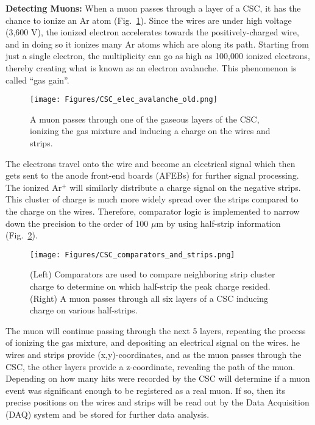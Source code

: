 {\bf Detecting Muons:}
When a muon passes through a layer of a CSC, it has the chance to ionize an Ar atom (Fig.~\ref{fig:e_avalanche}).
Since the wires are under high voltage (3,600 V), the ionized electron accelerates towards the positively-charged wire, and in doing so it ionizes many Ar atoms which are along its path. 
Starting from just a single electron, the multiplicity can go as high as 100,000 ionized electrons, thereby creating what is known as an electron avalanche. 
This phenomenon is called ``gas gain''.
\begin{figure}[pbth]
\centering
\texttt{[image: Figures/CSC\_elec\_avalanche\_old.png]}
    \caption{
    A muon passes through one of the gaseous layers of the CSC, ionizing the gas mixture and inducing a charge on the wires and strips. 
    }
    \label{fig:e_avalanche}
\end{figure}
The electrons travel onto the wire and become an electrical signal which then gets sent to the anode front-end boards (AFEBs) for further signal processing.
The ionized Ar$^+$ will similarly distribute a charge signal on the negative strips. 
This cluster of charge is much more widely spread over the strips compared to the charge on the wires.
Therefore, comparator logic is implemented to narrow down the precision to the order of 100 $\mu$m by using half-strip information (Fig.~\ref{fig:comparators}).
\begin{figure}[pbth]
\centering
\texttt{[image: Figures/CSC\_comparators\_and\_strips.png]}
    \caption{
    (Left) Comparators are used to compare neighboring strip cluster charge to determine on which half-strip the peak charge resided.
    (Right) A muon passes through all six layers of a CSC inducing charge on various half-strips.
    }
    \label{fig:comparators}
\end{figure}

The muon will continue passing through the next 5 layers, repeating the process of ionizing the gas mixture, and depositing an electrical signal on the wires. 
he wires and strips provide (x,y)-coordinates, and as the muon passes through the CSC, the other layers provide a z-coordinate, revealing the path of the muon.
Depending on how many hits were recorded by the CSC will determine if a muon event was significant enough to be registered as a real muon. 
If so, then its precise positions on the wires and strips will be read out by the Data Acquisition (DAQ) system and be stored for further data analysis.

